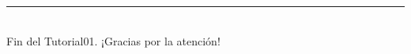\documentclass[10pt,a4paper]{article}\usepackage[]{graphicx}\usepackage[]{color}
\begin{document}






\vspace{2cm} \hrule
\quad\\
Fin del Tutorial01. ¡Gracias por la atención!

\newpage
%
\end{document}
